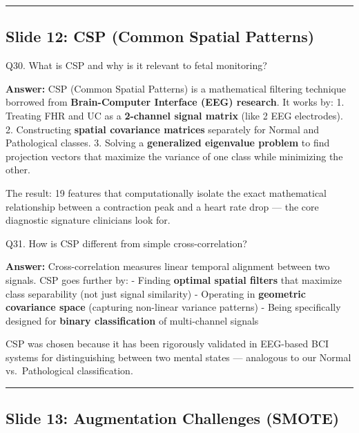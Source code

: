 \documentclass[11pt,a4paper]{article}
\begin{document}
\begin{center}\rule{0.5\linewidth}{0.5pt}\end{center}

\subsection{Slide 12: CSP (Common Spatial
Patterns)}\label{slide-12-csp-common-spatial-patterns}

\begin{questionbox}
Q30. What is CSP and why is it relevant to fetal monitoring?
\end{questionbox}
\textbf{Answer:} CSP (Common Spatial Patterns) is a mathematical filtering
technique borrowed from \textbf{Brain-Computer Interface (EEG)
research}. It works by: 1. Treating FHR and UC as a \textbf{2-channel
signal matrix} (like 2 EEG electrodes). 2. Constructing \textbf{spatial
covariance matrices} separately for Normal and Pathological classes. 3.
Solving a \textbf{generalized eigenvalue problem} to find projection
vectors that maximize the variance of one class while minimizing the
other.

The result: 19 features that computationally isolate the exact
mathematical relationship between a contraction peak and a heart rate
drop --- the core diagnostic signature clinicians look for.

\begin{questionbox}
Q31. How is CSP different from simple cross-correlation?
\end{questionbox}
\textbf{Answer:} Cross-correlation measures linear temporal alignment between
two signals. CSP goes further by: - Finding \textbf{optimal spatial
filters} that maximize class separability (not just signal similarity) -
Operating in \textbf{geometric covariance space} (capturing non-linear
variance patterns) - Being specifically designed for \textbf{binary
classification} of multi-channel signals

CSP was chosen because it has been rigorously validated in EEG-based BCI
systems for distinguishing between two mental states --- analogous to
our Normal vs.~Pathological classification.

\begin{center}\rule{0.5\linewidth}{0.5pt}\end{center}

\subsection{Slide 13: Augmentation Challenges
(SMOTE)}\label{slide-13-augmentation-challenges-smote}
\end{document}
